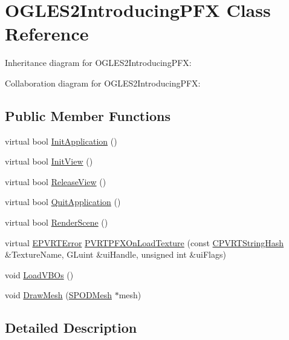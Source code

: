 \hypertarget{class_o_g_l_e_s2_introducing_p_f_x}{\section{O\+G\+L\+E\+S2\+Introducing\+P\+F\+X Class Reference}
\label{class_o_g_l_e_s2_introducing_p_f_x}
}


Inheritance diagram for O\+G\+L\+E\+S2\+Introducing\+P\+F\+X\+:


Collaboration diagram for O\+G\+L\+E\+S2\+Introducing\+P\+F\+X\+:
\subsection*{Public Member Functions}
\begin{DoxyCompactItemize}
\item 
virtual bool \hyperlink{class_o_g_l_e_s2_introducing_p_f_x_ab077e59fff8cb42eddb638bc3c13b94d}{Init\+Application} ()
\item 
virtual bool \hyperlink{class_o_g_l_e_s2_introducing_p_f_x_a60689521ef922e6ac479011562f4e3c8}{Init\+View} ()
\item 
virtual bool \hyperlink{class_o_g_l_e_s2_introducing_p_f_x_a6eb886f9207c13f7b85517b0f97cece8}{Release\+View} ()
\item 
virtual bool \hyperlink{class_o_g_l_e_s2_introducing_p_f_x_a929a28c17daeec863620ab0f53e94f77}{Quit\+Application} ()
\item 
virtual bool \hyperlink{class_o_g_l_e_s2_introducing_p_f_x_abd135f321ff162912855a4755cee21e3}{Render\+Scene} ()
\item 
virtual \hyperlink{_p_v_r_t_error_8h_a9e837ff1a83f3a5f332bc4cc78454608}{E\+P\+V\+R\+T\+Error} \hyperlink{class_o_g_l_e_s2_introducing_p_f_x_a13c6eb452be5d14189fbd050ee6ae51d}{P\+V\+R\+T\+P\+F\+X\+On\+Load\+Texture} (const \hyperlink{class_c_p_v_r_t_string_hash}{C\+P\+V\+R\+T\+String\+Hash} \&Texture\+Name, G\+Luint \&ui\+Handle, unsigned int \&ui\+Flags)
\item 
void \hyperlink{class_o_g_l_e_s2_introducing_p_f_x_a55e044a4bc3e92a1524bd3b24a724065}{Load\+V\+B\+Os} ()
\item 
void \hyperlink{class_o_g_l_e_s2_introducing_p_f_x_a9e7d18b65e6d14dacde12c96a59ef5ff}{Draw\+Mesh} (\hyperlink{struct_s_p_o_d_mesh}{S\+P\+O\+D\+Mesh} $\ast$mesh)
\end{DoxyCompactItemize}


\subsection{Detailed Description}


